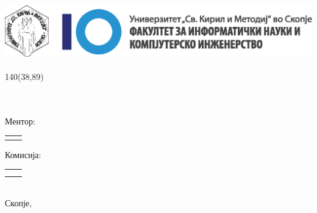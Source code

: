 \begin{titlepage}
	\begin{center}
		\includegraphics[height=2.5cm]{fcse-logo_mk}\\
		\large
		
		\vspace*{14cm}
		
		\setlength{\TPHorizModule}{1mm}
		\setlength{\TPVertModule}{\TPHorizModule}
		\newlength{\backupparindent}
		\setlength{\backupparindent}{\parindent}
		\setlength{\parindent}{0mm}			
		\begin{textblock}{140}(38,89)
			\vspace*{1mm}
			\huge
			\textbf{\doctitle \\}
			\Large
			\vspace*{5mm}
			\textit{\docsubtitle}\\
			\vspace*{10mm}
			\Large
			\me\\
		\end{textblock}
		
		Ментор:\\
		\begin{tabular}{rl}
			\firstCommitteeMember\\
		\end{tabular}
		\vfill
		
		Комисија:\\
		\begin{tabular}{rl}
			\secondCommitteeMember\\
			\thirdCommitteeMember\\
		\end{tabular}
		
		
		\vfill
		\vfill
		
		\version \\
		\large
		Скопје, \monthYear\\
		
		\setlength{\parindent}{\backupparindent}
	\end{center}
\end{titlepage}
